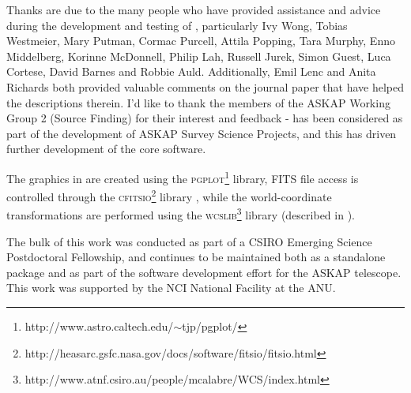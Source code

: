%
%
%
%

Thanks are due to the many people who have provided assistance and
advice during the development and testing of \duchamp, particularly
Ivy Wong, Tobias Westmeier, Mary Putman, Cormac Purcell, Attila
Popping, Tara Murphy, Enno Middelberg, Korinne McDonnell, Philip Lah,
Russell Jurek, Simon Guest, Luca Cortese, David Barnes and Robbie
Auld. Additionally, Emil Lenc and Anita Richards both provided
valuable comments on the journal paper that have helped the
descriptions therein. I'd like to thank the members of the ASKAP
Working Group 2 (Source Finding) for their interest and feedback -
\duchamp has been considered as part of the development of ASKAP
Survey Science Projects, and this has driven further development of
the core \duchamp software.

The graphics in \duchamp are created using the
\textsc{pgplot}\footnote{http://www.astro.caltech.edu/$\sim$tjp/pgplot/}
library, FITS file access is controlled through the
\textsc{cfitsio}\footnote{http://heasarc.gsfc.nasa.gov/docs/software/fitsio/fitsio.html}
library \citep{pence99}, while the world-coordinate transformations
are performed using the
\textsc{wcslib}\footnote{http://www.atnf.csiro.au/people/mcalabre/WCS/index.html}
library (described in \citet{calabretta02}).

The bulk of this work was conducted as part of a CSIRO Emerging
Science Postdoctoral Fellowship, and \duchamp continues to be
maintained both as a standalone package and as part of the software
development effort for the ASKAP telescope. This work was supported by
the NCI National Facility at the ANU.



